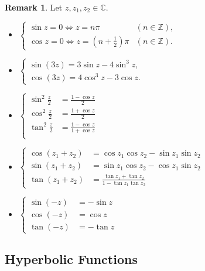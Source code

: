 \documentclass[12pt,openany]{book}
\theoremstyle{definition}
\newtheorem{remark}{Remark}[section]
\newcommand{\Z}{\mathbb{Z}}
\newcommand{\C}{\mathbb{C}}
\newcommand{\of}[1]{\left( #1 \right)}
\begin{document}
	\begin{remark}
		Let $z,z_1,z_2\in\C$. \begin{itemize}
			\item $\begin{cases}
			\sin z=0\Leftrightarrow z=n\pi& (n\in\Z),\\
			\cos z=0\Leftrightarrow z=\of{n+\frac{1}{2}}\pi& (n\in\Z).
			\end{cases}$
			\item $\begin{cases}
			\sin(3z)=3\sin z-4\sin^3z,\\
			\cos(3z)=4\cos^3z-3\cos z.
			\end{cases}$
			\item $\begin{cases}
			\sin^2\frac{z}{2}&=\displaystyle\frac{1-\cos z}{2}\\
			\cos^2\frac{z}{2}&=\displaystyle\frac{1+\cos z}{2}\\
			\tan^2\frac{z}{2}&=\displaystyle\frac{1-\cos z}{1+\cos z}\\
			\end{cases}$
			\item $\begin{cases}
			\cos(z_1+z_2)&=\cos z_1\cos z_2-\sin z_1\sin z_2\\
			\sin(z_1+z_2)&=\sin z_1\cos z_2-\cos z_1\sin z_2\\
			\tan(z_1+z_2)&=\frac{\tan z_1+\tan z_2}{1-\tan z_1\tan z_2}
			\end{cases}$
			\item $\begin{cases}
			\sin(-z)&=-\sin z\\
			\cos(-z)&=\cos z\\
			\tan(-z)&=-\tan z
			\end{cases}$
		\end{itemize}
	\end{remark}
	
	\subsection{Hyperbolic Functions}
	
\end{document}
